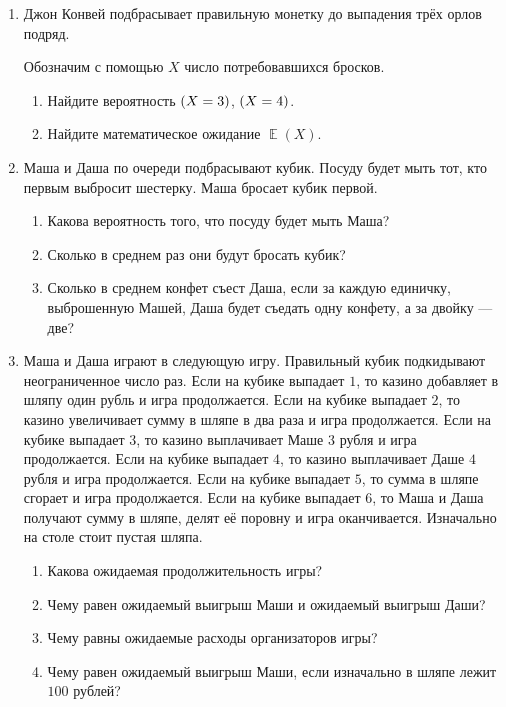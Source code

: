 \documentclass[12pt]{article}
\let\P\relax
\DeclareMathOperator{\P}{\mathbb{P}}
\DeclareMathOperator{\E}{\mathbb{E}}
\newcommand{\addtag}[1]{\index{#1}}
\begin{document}
\begin{enumerate}
    \item Джон Конвей \raisebox{-3pt}{\begin{tikzpicture}[scale=0.3]
    \duck[
        cape=black,
        hat=black,
        mask=black
    ]
    \end{tikzpicture}} подбрасывает правильную монетку до выпадения трёх орлов подряд. 

    Обозначим с помощью $X$ число потребовавшихся бросков. 

    \begin{enumerate}
        \item Найдите вероятность $\P(X = 3)$, $\P(X = 4)$.
        \item Найдите математическое ожидание $\E(X)$.
    \end{enumerate}

\item Маша и Даша по очереди подбрасывают кубик\addtag{кубик}.
Посуду будет мыть тот, кто первым выбросит шестерку.
Маша бросает кубик первой.

\begin{enumerate}
\item Какова вероятность того, что посуду будет мыть Маша?
\item Сколько в среднем раз они будут бросать кубик\addtag{кубик}?
\item Сколько в среднем конфет съест Даша, если за каждую единичку, выброшенную Машей, Даша будет съедать одну конфету, а за двойку — две?
\end{enumerate}


\item Маша и Даша играют в следующую игру. 
 Правильный кубик подкидывают неограниченное число раз.
 Если на кубике\addtag{кубик} выпадает $1$, то казино добавляет в шляпу один рубль и игра продолжается.
 Если на кубике выпадает $2$, то казино увеличивает сумму в шляпе в два раза и игра продолжается. 
 Если на кубике выпадает $3$, то казино выплачивает Маше $3$ рубля и игра продолжается. 
 Если на кубике выпадает $4$, то казино выплачивает Даше $4$ рубля и игра продолжается. 
 Если на кубике выпадает $5$, то сумма в шляпе сгорает и игра продолжается.
 Если на кубике выпадает $6$, то Маша и Даша получают сумму в шляпе, делят её поровну и игра оканчивается.
Изначально на столе стоит пустая шляпа.
 \begin{enumerate}
\item Какова ожидаемая продолжительность игры?
\item Чему равен ожидаемый выигрыш Маши и ожидаемый выигрыш Даши?
\item Чему равны ожидаемые расходы организаторов игры?
\item Чему равен ожидаемый выигрыш Маши, если изначально в шляпе лежит $100$ рублей?
\end{enumerate}


\end{enumerate}
\end{document}

